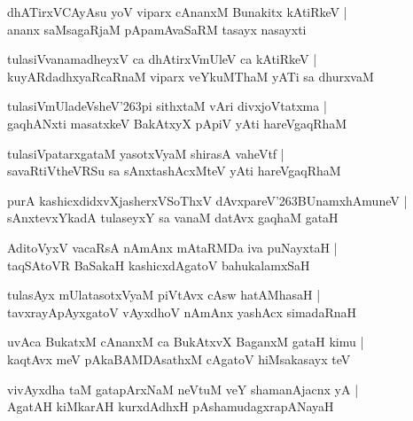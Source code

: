 \begin{shloka}
dhATirxVCAyAsu yoV viparx cAnanxM Bunakitx kAtiRkeV |\\
ananx saMsagaRjaM pApamAvaSaRM tasayx nasayxti
\end{shloka}

\begin{shloka}
tulasiVvanamadheyxV ca dhAtirxVmUleV ca kAtiRkeV |\\
kuyARdadhxyaRcaRnaM viparx veYkuMThaM yATi sa dhurxvaM 
\end{shloka}

\begin{shloka}
tulasiVmUladeVsheV\char'263pi sithxtaM vAri divxjoVtatxma |\\
gaqhANxti masatxkeV BakAtxyX pApiV yAti hareVgaqRhaM
\end{shloka}

\begin{shloka}
tulasiVpatarxgataM yasotxVyaM shirasA vaheVtf |\\
savaRtiVtheVRSu sa sAnxtashAcxMteV yAti hareVgaqRhaM 
\end{shloka}

\begin{shloka}
purA kashicxdidxvXjasherxVSoThxV dAvxpareV\char'263BUnamxhAmuneV |\\
sAnxtevxYkadA tulaseyxY sa vanaM datAvx gaqhaM gataH 
\end{shloka}

\begin{shloka}
AditoVyxV vacaRsA nAmAnx mAtaRMDa iva puNayxtaH |\\
taqSAtoVR BaSakaH kashicxdAgatoV bahukalamxSaH
\end{shloka}

\begin{shloka}
tulasAyx mUlatasotxVyaM piVtAvx cAsw hatAM{ha}saH |\\
tavxrayApAyxgatoV vAyxdhoV nAmAnx yashAcx simadaRnaH 
\end{shloka}

\begin{shloka}
uvAca BukatxM cAnanxM ca BukAtxvX BaganxM gataH kimu |\\
kaqtAvx meV pAkaBAMDAsathxM cAgatoV hiMsakasayx teV 
\end{shloka}

\begin{shloka}
vivAyxdha taM gatapArxNaM neVtuM veY shamanAjacnx yA |\\
AgatAH kiMkarAH kurxdAdhxH pAshamudagxrapANayaH
\end{shloka}

